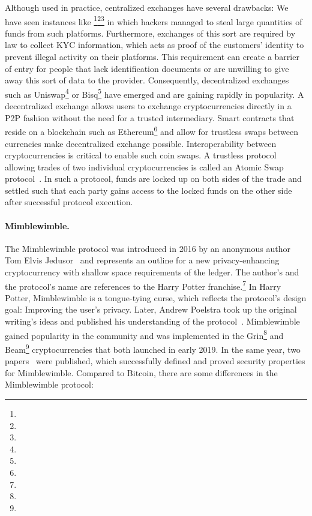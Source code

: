 Although used in practice, centralized exchanges have several drawbacks:
We have seen instances like \footnote{\urlmtgox}\footnote{\urlbitgrail}\footnote{\urlquadriga} in which hackers managed to steal large quantities of funds from such platforms.
Furthermore, exchanges of this sort are required by law to collect KYC information, which acts as proof of the customers' identity to prevent illegal activity on their platforms.
This requirement can create a barrier of entry for people that lack identification documents or are unwilling to give away this sort of data to the provider.
Consequently, decentralized exchanges such as Uniswap\footnote{\urluniswp} or Bisq\footnote{\urlbisq} have emerged and are gaining rapidly in popularity.
A decentralized exchange allows users to exchange cryptocurrencies directly in a P2P fashion without the need for a trusted intermediary.
Smart contracts that reside on a blockchain such as Ethereum\footnote{\urlethereum} and allow for trustless swaps between currencies make decentralized exchange possible.
Interoperability between cryptocurrencies is critical to enable such coin swaps.
A trustless protocol allowing trades of two individual cryptocurrencies is called an Atomic Swap protocol~\cite{herlihy2018atomic}.
In such a protocol, funds are locked up on both sides of the trade and settled such that each party gains access to the locked funds on the other side after successful protocol execution.

\paragraph{Mimblewimble.} The Mimblewimble protocol was introduced in 2016 by an anonymous author Tom Elvis Jedusor~\cite{jedusor2016mimblewimble} and represents an outline for a new privacy-enhancing cryptocurrency with shallow space requirements of the ledger.
The author’s and the protocol's name are references to the Harry Potter franchise.\footnote{\urlharrypotter}
In Harry Potter, Mimblewimble is a tongue-tying curse, which reflects the protocol's design goal: Improving the user's privacy.
Later, Andrew Poelstra took up the original writing's ideas and published his understanding of the protocol~\cite{poelstra2016mimblewimble}.
Mimblewimble gained popularity in the community and was implemented in the Grin\footnote{\urlgrin} and Beam\footnote{\urlbeam} cryptocurrencies that both launched in early 2019.
In the same year, two papers~\cite{fuchsbauer2019aggregate,betarte2019towards} were published, which successfully defined and proved security properties for Mimblewimble.
Compared to Bitcoin, there are some differences in the Mimblewimble protocol:

